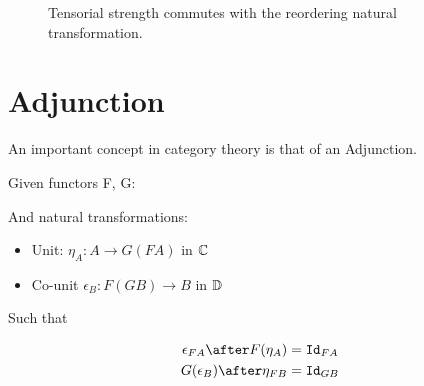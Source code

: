 \documentclass{Report}
\begin{document}
\begin{figure}
    \centering
    \begin{minipage}{0.45\textwidth}
    \end{minipage}
    \caption{Tensorial strength commutes with the reordering natural transformation.}
    \label{TensorStrengthAlpha}
\end{figure}






\section{Adjunction}
An important concept in category theory is that of an Adjunction.

Given functors F, G:


And natural transformations:

\begin{itemize}
    \item Unit: $\eta_A: A \rightarrow G(F A)$ in $\mathbb{C}$
    \item Co-unit $\epsilon_B: F(G B) \rightarrow B$ in $\mathbb{D}$
\end{itemize}

Such that 

\begin{align}
    \epsilon_{F A}\after F(\eta_A) & = \Id{F A} \\
    G(\epsilon_B)\after \eta_{F B} & = \Id{G B}
\end{align}
\end{document}
